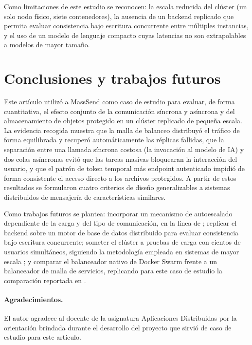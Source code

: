 Como limitaciones de este estudio se reconocen: la escala reducida del
clúster (un solo nodo físico, siete contenedores), la ausencia de un backend
replicado que permita evaluar consistencia bajo escritura concurrente entre
múltiples instancias, y el uso de un modelo de lenguaje compacto cuyas
latencias no son extrapolables a modelos de mayor tamaño.

\section{Conclusiones y trabajos futuros}

Este artículo utilizó a MassSend como caso de estudio para evaluar, de forma
cuantitativa, el efecto conjunto de la comunicación síncrona y asíncrona y
del almacenamiento de objetos protegido en un clúster replicado de pequeña
escala. La evidencia recogida muestra que la malla de balanceo distribuyó el
tráfico de forma equilibrada y recuperó automáticamente las réplicas
fallidas, que la separación entre una llamada síncrona costosa (la
invocación al modelo de IA) y dos colas asíncronas evitó que las tareas
masivas bloquearan la interacción del usuario, y que el patrón de token
temporal más endpoint autenticado impidió de forma consistente el acceso
directo a los archivos protegidos. A partir de estos resultados se
formularon cuatro criterios de diseño generalizables a sistemas distribuidos
de mensajería de características similares.

Como trabajos futuros se plantea: incorporar un mecanismo de autoescalado
dependiente de la carga y del tipo de comunicación, en la línea de
\cite{ref1}; replicar el backend sobre un motor de base de datos distribuido
para evaluar consistencia bajo escritura concurrente; someter el clúster a
pruebas de carga con cientos de usuarios simultáneos, siguiendo la
metodología empleada en sistemas de mayor escala \cite{ref7,ref8}; y comparar
el balanceador nativo de Docker Swarm frente a un balanceador de malla de
servicios, replicando para este caso de estudio la comparación reportada en
\cite{ref6}.

\paragraph{Agradecimientos.} El autor agradece al docente de la asignatura
Aplicaciones Distribuidas por la orientación brindada durante el desarrollo
del proyecto que sirvió de caso de estudio para este artículo.

